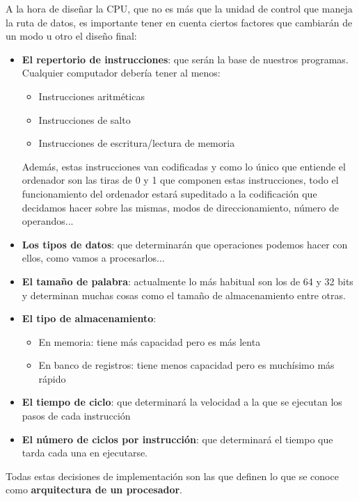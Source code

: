 \documentclass[a4paper,10pt]{book}
\begin{document}
A la hora de diseñar la CPU, que no es más que la unidad de control que maneja la ruta de datos, es importante tener en cuenta ciertos factores que cambiarán de un modo u otro el diseño final:
\begin{itemize}
\item \textbf{El repertorio de instrucciones}: que serán la base de nuestros programas. Cualquier computador debería tener al menos:
	\begin{itemize}
	\item Instrucciones aritméticas
	\item Instrucciones de salto
	\item Instrucciones de escritura/lectura de memoria
	\end{itemize}
Además, estas instrucciones van codificadas y como lo único que entiende el ordenador son las tiras de 0 y 1 que componen estas instrucciones, todo el funcionamiento del ordenador estará supeditado a la codificación que decidamos hacer sobre las mismas, modos de direccionamiento, número de operandos...
\item \textbf{Los tipos de datos}: que determinarán que operaciones podemos hacer con ellos, como vamos a procesarlos...
\item \textbf{El tamaño de palabra}: actualmente lo más habitual son los de 64 y 32 bits y determinan muchas cosas como el tamaño de almacenamiento entre otras.
\item \textbf{El tipo de almacenamiento}:
	\begin{itemize}
	\item En memoria: tiene más capacidad pero es más lenta
	\item En banco de registros: tiene menos capacidad pero es muchísimo más rápido
	\end{itemize}
\item \textbf{El tiempo de ciclo}: que determinará la velocidad a la que se ejecutan los pasos de cada instrucción
\item \textbf{El número de ciclos por instrucción}: que determinará el tiempo que tarda cada una en ejecutarse.
\end{itemize}
Todas estas decisiones de implementación son las que definen lo que se conoce como \textbf{arquitectura de un procesador}.
\end{document}
